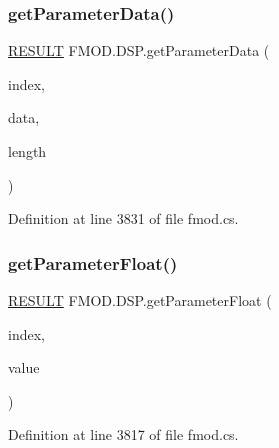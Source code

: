 \mbox{\label{class_f_m_o_d_1_1_d_s_p_a228cbd3a8b9104395c749730ca094226}} 
\subsubsection{\texorpdfstring{get\+Parameter\+Data()}{getParameterData()}}
{\footnotesize\ttfamily \hyperlink{namespace_f_m_o_d_a305d1176ef3f8c8815861a60407ac33d}{R\+E\+S\+U\+LT} F\+M\+O\+D.\+D\+S\+P.\+get\+Parameter\+Data (\begin{DoxyParamCaption}\item[{int}]{index,  }\item[{out Int\+Ptr}]{data,  }\item[{out uint}]{length }\end{DoxyParamCaption})}



Definition at line 3831 of file fmod.\+cs.

\mbox{\label{class_f_m_o_d_1_1_d_s_p_a126a21495cfc47d5a7782779f58bf2fd}} 
\subsubsection{\texorpdfstring{get\+Parameter\+Float()}{getParameterFloat()}}
{\footnotesize\ttfamily \hyperlink{namespace_f_m_o_d_a305d1176ef3f8c8815861a60407ac33d}{R\+E\+S\+U\+LT} F\+M\+O\+D.\+D\+S\+P.\+get\+Parameter\+Float (\begin{DoxyParamCaption}\item[{int}]{index,  }\item[{out float}]{value }\end{DoxyParamCaption})}



Definition at line 3817 of file fmod.\+cs.

\mbox{\label{class_f_m_o_d_1_1_d_s_p_a86296128281b8872e1494647f2fa41f0}} 
